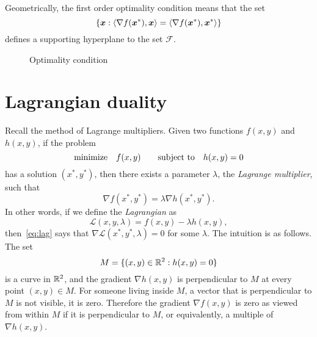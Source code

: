 Geometrically, the first order optimality condition means that the set
\begin{equation*}
 \{\bm{x}\mathrel{\mathop{:}} \langle {\nabla f(\bm{x}^*)}, {\bm{x}} \rangle=\langle {\nabla f(\bm{x}^*)}, {\bm{x}^*} \rangle\}
\end{equation*}
defines a supporting hyperplane to the set $\mathcal{F}$.

\begin{figure}[h!]
\centering
{}
\caption{Optimality condition} \label{fig:neg}
\end{figure}

\section{Lagrangian duality}
Recall the method of Lagrange multipliers. Given two functions $f(x,y)$ and $h(x,y)$, if the problem
\begin{equation*}
 \text{minimize}\quad f(x,y) \quad \quad\text{subject to}\quad h(x,y)=0
\end{equation*}
has a solution $(x^*,y^*)$, then there exists a parameter $\lambda$, the {\em Lagrange multiplier}, such that
\begin{equation}\label{eq:lag}
 \nabla f(x^*,y^*) = \lambda \nabla h(x^*,y^*).
\end{equation}
In other words, if we define the {\em Lagrangian} as 
\begin{equation*}
 \mathcal{L}(x,y,\lambda) = f(x,y)-\lambda h(x,y),
\end{equation*}
then~\eqref{eq:lag} says that $\nabla \mathcal{L}(x^*,y^*,\lambda) = 0$ for some $\lambda$. The intuition is as follows. The set
\begin{equation*}
 M = \{(x,y)\in \mathbb{R}^2 \mathrel{\mathop{:}} h(x,y)=0\}
\end{equation*}
is a curve in $\mathbb{R}^2$, and the gradient $\nabla h(x,y)$ is perpendicular to $M$ at every point $(x,y)\in M$. For someone living inside $M$, a vector that is perpendicular to $M$ is not visible, it is zero. Therefore the gradient $\nabla f(x,y)$ is zero as viewed from within $M$ if it is perpendicular to $M$, or equivalently, a multiple of $\nabla h(x,y)$.



